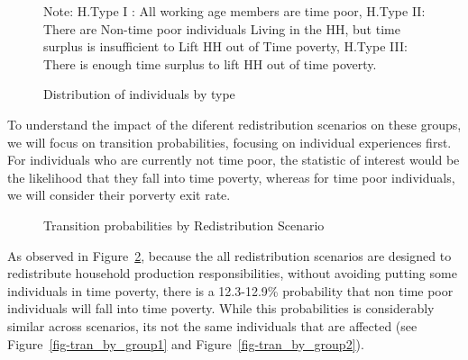 \documentclass[
  11pt,
]{article}
\begin{document}
\begin{figure}[H]
{\begin{figure}[H]
\begin{minipage}{0.50\linewidth}
{}


\end{minipage}%

\end{figure}%

\footnotesize 

\begin{flushleft}Note: H.Type I : All working age members are time poor, H.Type II: There are Non-time poor individuals Living in the HH, but time surplus is insufficient to Lift HH out of Time poverty, H.Type III: There is enough time surplus to lift HH out of time poverty.\end{flushleft}

}

\caption{\label{fig-dist}Distribution of individuals by type}

\end{figure}%

To understand the impact of the diferent redistribution scenarios on
these groups, we will focus on transition probabilities, focusing on
individual experiences first. For individuals who are currently not time
poor, the statistic of interest would be the likelihood that they fall
into time poverty, whereas for time poor individuals, we will consider
their porverty exit rate.

\begin{figure}[H]


\caption{\label{fig-transition1}Transition probabilities by
Redistribution Scenario}

\end{figure}%

As observed in Figure~\ref{fig-transition1}, because the all
redistribution scenarios are designed to redistribute household
production responsibilities, without avoiding putting some individuals
in time poverty, there is a 12.3-12.9\% probability that non time poor
individuals will fall into time poverty. While this probabilities is
considerably similar across scenarios, its not the same individuals that
are affected (see Figure~\ref{fig-tran_by_group1} and
Figure~\ref{fig-tran_by_group2}).
\end{document}
